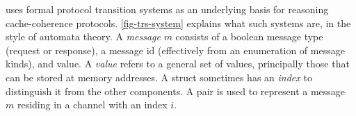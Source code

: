\documentclass[sigplan,10pt,review,anonymous,screen]{acmart}\settopmatter{printfolios=true,printccs=false,printacmref=false}
\begin{document}

\hemiola{} uses formal protocol transition systems as an underlying basis for reasoning cache-coherence protocols.
\autoref{fig-trs-system} explains what such systems are, in the style of automata theory.
A \emph{message} $m$ consists of a boolean message type (request or response), a message id (effectively from an enumeration of message kinds), and value.
A \emph{value} refers to a general set of values, principally those that can be stored at memory addresses.
A struct sometimes has an \emph{index} to distinguish it from the other components.
A pair  is used to represent a message $m$ residing in a channel with an index $i$.
\end{document}
